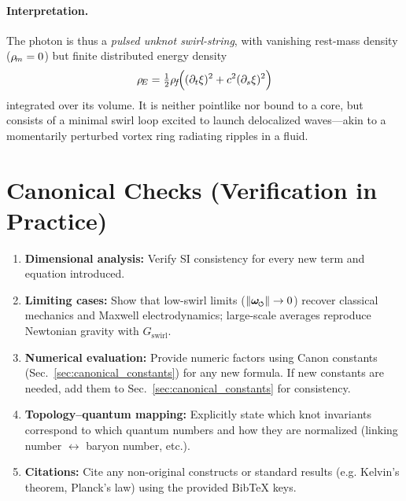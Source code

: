 \documentclass[11pt]{article}
\begin{document}
\paragraph{Interpretation.}
    The photon is thus a \emph{pulsed unknot swirl-string}, with vanishing rest-mass density ($\rho_{\!m}=0$) but finite distributed energy density
    \[
        \rho_{\!E} = \tfrac{1}{2}\rho_{\!f}\!\Big((\partial_t \xi)^2 + c^2 (\partial_s \xi)^2\Big)
    \]
    integrated over its volume. It is neither pointlike nor bound to a core, but consists of a minimal swirl loop excited to launch delocalized waves—akin to a momentarily perturbed vortex ring radiating ripples in a fluid.

\section{Canonical Checks (Verification in Practice)}
\label{sec:canonical_checks}
\begin{enumerate}
\item \textbf{Dimensional analysis:} Verify SI consistency for every new term and equation introduced.
\item \textbf{Limiting cases:} Show that low-swirl limits ($\|\omegas\|\to 0$) recover classical mechanics and Maxwell electrodynamics; large-scale averages reproduce Newtonian gravity with $G_{\text{swirl}}$.
\item \textbf{Numerical evaluation:} Provide numeric factors using Canon constants (Sec.~\ref{sec:canonical_constants}) for any new formula. If new constants are needed, add them to Sec.~\ref{sec:canonical_constants} for consistency.
\item \textbf{Topology–quantum mapping:} Explicitly state which knot invariants correspond to which quantum numbers and how they are normalized (linking number $\leftrightarrow$ baryon number, etc.).
\item \textbf{Citations:} Cite any non-original constructs or standard results (e.g. Kelvin’s theorem, Planck’s law) using the provided BibTeX keys.
\end{enumerate}

\end{document}
